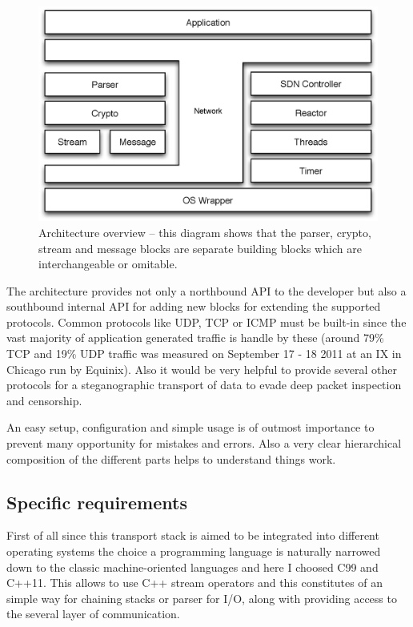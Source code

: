 \documentclass[twocolumn,english]{IEEEtran}
\theoremstyle{plain}
\theoremstyle{plain}
\begin{document}
\begin{figure}[h]
\includegraphics[width=\columnwidth]{Architecture_overview.eps}
\caption{Architecture overview -- this diagram shows that the parser, crypto,
stream and message blocks are separate building blocks which are
interchangeable or omitable.}
\label{fig:arch-overview}
\end{figure}

The architecture provides not only a northbound API to the developer but also
a southbound internal API for adding new blocks for extending the supported
protocols. Common protocols like UDP, TCP or ICMP must be built-in since the
vast majority of application generated traffic is handle by these (around 79\%
TCP and 19\% UDP traffic was measured on September 17 - 18 2011 at an IX in
Chicago run by Equinix\cite{caida:application-protocol-percentage}). Also it
would be very helpful to provide several other protocols for a steganographic
transport of data\cite{ijcsi:dns-steganography} to evade deep packet
inspection and censorship.

An easy setup, configuration and simple usage is of outmost importance to
prevent many opportunity for mistakes and errors. Also a very clear
hierarchical composition of the different parts helps to understand things
work.

\subsection{Specific requirements}

First of all since this transport stack is aimed to be integrated into
different operating systems the choice a programming language is naturally
narrowed down to the classic machine-oriented languages and here I choosed C99
and C++11. This allows to use C++ stream operators and this constitutes of an
simple way for chaining stacks or parser for I/O, along with providing access
to the several layer of communication.
\end{document}
